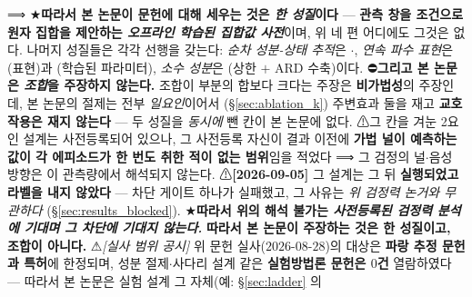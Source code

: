 \documentclass[11pt]{report}
\numberwithin{equation}{chapter}
\numberwithin{figure}{chapter}
\numberwithin{table}{chapter}
\begin{document}
⟹ ★\textbf{따라서 본 논문이 문헌에 대해 세우는 것은 \emph{한 성질}이다} ---
\textbf{관측 창을 조건으로 원자 집합을 제안하는 \emph{오프라인 학습된 집합값 사전}}이며,
위 네 편 어디에도 그것은 없다. 나머지 성질들은 각각 선행을 갖는다: \emph{순차 성분-상태
추적}은 \citet{Pascoal2017DirSpectra}$\cdot$\citet{Kim2019InverseKF},
\emph{연속 파수 표현}은 \citet{Charnotskii2011SparseSpectrum}(표현)과
\citet{WilsonAdams2013}(학습된 파라미터), \emph{소수 성분}은
\citet{WilsonAdams2013}(상한 $+$ ARD 수축)이다.
⛔\textbf{그리고 본 논문은 \emph{조합}을 주장하지 않는다.} 조합이 부분의 합보다 크다는
주장은 \textbf{비가법성}의 주장인데, 본 논문의 절제는 전부 \emph{일요인}이어서
(\S\ref{sec:ablation_k}) 주변효과 둘을 재고 \textbf{교호작용은 재지 않는다} --- 두 성질을
\emph{동시에} 뺀 칸이 본 논문에 없다. ⚠그 칸을 겨눈 2요인 설계는 사전등록되어 있으나,
그 사전등록 자신이 결과 이전에 \textbf{가법 널이 예측하는 값이 각 에피소드가 한 번도
취한 적이 없는 범위}임을 적었다 ⟹ 그 검정의 널$\cdot$음성 방향은 이 관측량에서 해석되지 않는다.
⚠\textbf{[2026-09-05]} 그 설계는 그 뒤 \textbf{실행되었고 라벨을 내지 않았다} --- 차단
게이트 하나가 실패했고, 그 사유는 \emph{위 검정력 논거와 무관하다}
(\S\ref{sec:results_blocked}). ★\textbf{따라서 위의 해석 불가는 \emph{사전등록된 검정력
분석에 기대며 그 차단에 기대지 않는다.}}
\textbf{따라서 본 논문이 주장하는 것은 한 성질이고, 조합이 아니다.}
⚠\emph{[실사 범위 공시]} 위 문헌 실사($2026$-$08$-$28$)의 대상은 \textbf{파랑 추정
문헌과 특허}에 한정되며, 성분 절제$\cdot$사다리 설계 같은 \textbf{실험방법론 문헌은
$0$건} 열람하였다 --- 따라서 본 논문은 실험 설계 그 자체(예: \S\ref{sec:ladder} 의
\end{document}
